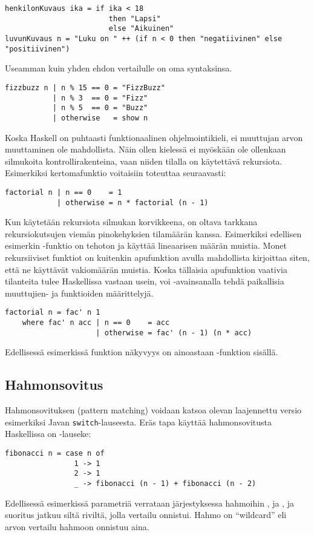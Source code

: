 \begin{verbatim}
henkilonKuvaus ika = if ika < 18
                        then "Lapsi"
                        else "Aikuinen"
luvunKuvaus n = "Luku on " ++ (if n < 0 then "negatiivinen" else "positiivinen")
\end{verbatim}
Useamman kuin yhden ehdon vertailulle on oma syntaksinsa.
\begin{verbatim}
fizzbuzz n | n % 15 == 0 = "FizzBuzz"
           | n % 3  == 0 = "Fizz"
           | n % 5  == 0 = "Buzz"
           | otherwise   = show n
\end{verbatim}
Koska Haskell on puhtaasti funktionaalinen ohjelmointikieli,
ei muuttujan arvon muuttaminen ole mahdollista.
Näin ollen kielessä ei myöskään ole ollenkaan silmukoita kontrollirakenteina,
vaan niiden tilalla on käytettävä rekursiota.
Esimerkiksi kertomafunktio voitaisiin toteuttaa seuraavasti:
\begin{verbatim}
factorial n | n == 0    = 1
            | otherwise = n * factorial (n - 1)
\end{verbatim}
Kun käytetään rekursiota silmukan korvikkeena,
on oltava tarkkana rekursiokutsujen viemän pinokehyksien tilamäärän kanssa.
Esimerkiksi edellisen esimerkin -funktio on tehoton ja käyttää lineaarisen määrän muistia.
Monet rekursiiviset funktiot on kuitenkin apufunktion avulla mahdollista kirjoittaa siten,
että ne käyttävät vakiomäärän muistia.
Koska tällaisia apufunktion vaativia tilanteita tulee Haskellissa vastaan usein,
voi -avainsanalla tehdä paikallisia muuttujien- ja funktioiden määrittelyjä.
\begin{verbatim}
factorial n = fac' n 1
    where fac' n acc | n == 0    = acc
                     | otherwise = fac' (n - 1) (n * acc)
\end{verbatim}
Edellisessä esimerkissä funktion  näkyvyys on ainoastaan -funktion sisällä.

\subsection{Hahmonsovitus}
Hahmonsovituksen (pattern matching) voidaan katsoa olevan laajennettu versio esimerkiksi Javan \texttt{switch}-lauseesta.
Eräs tapa käyttää hahmonsovitusta Haskellissa on -lauseke:
\begin{verbatim}
fibonacci n = case n of
                1 -> 1
                2 -> 1
                _ -> fibonacci (n - 1) + fibonacci (n - 2)
\end{verbatim}
Edellisessä esimerkissä parametriä  verrataan järjestyksessa hahmoihin ,  ja \Haskell{\_},
ja suoritus jatkuu siltä riviltä, jolla vertailu onnistui.
Hahmo \Haskell{\_} on ``wildcard'' eli arvon vertailu hahmoon onnistuu aina.

